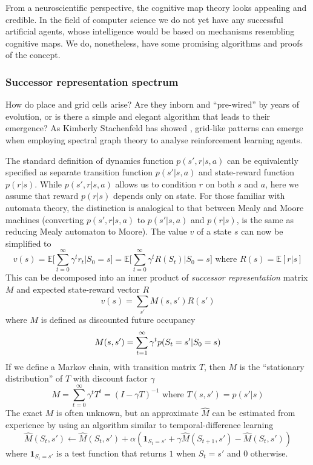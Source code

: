 \documentclass[12pt]{article}
\begin{document}
From a neuroscientific perspective, the cognitive map theory looks appealing and credible. In the field of computer science we do not yet have any successful artificial agents, whose intelligence would be based on mechanisms resembling cognitive maps. We do, nonetheless, have some promising algorithms and proofs of the concept. 


\subsubsection{Successor representation spectrum}
How do place and grid cells arise? Are they inborn and ``pre-wired'' by years of evolution, or is there a simple and elegant algorithm that leads to their emergence? 
As Kimberly Stachenfeld has showed \cite{hipp_as_cog_map}, grid-like patterns can emerge when employing spectral graph theory to analyse reinforcement learning agents. 

The standard definition of dynamics function $p(s',r|s,a)$ can be equivalently specified as separate transition function $p(s'|s,a)$ and state-reward function $p(r|s)$.
While $p(s',r|s,a)$ allows us to condition $r$ on both $s$ and $a$,  here we assume that reward $p(r|s)$ depends only on state. For those familiar with automata theory, the distinction is analogical to that between Mealy and Moore machines (converting $p(s',r|s,a)$ to $p(s'|s,a)$ and $p(r|s)$, is the same as reducing Mealy automaton to Moore). The value $v$ of a state $s$ can now be simplified to
\[
v(s) = \mathbb{E}\big[\sum_{t=0}^\infty \gamma^t r_t\big\vert S_0=s\big] = \mathbb{E}\big[\sum_{t=0}^\infty \gamma^t R(S_t)\big\vert S_0=s\big]\text{ where }R(s)=\mathbb{E}[r|s]
\]
This can be decomposed into an inner product of \textit{successor representation} matrix $M$ and expected state-reward vector $R$
\[
v(s) = \sum_{s'} M(s,s') R(s')
\]
where $M$ is defined as discounted future occupancy
\[
M(s,s') = \sum_{t=1}^\infty \gamma ^t p(S_t=s'|S_0=s) \\
\]
If we define a Markov chain, with transition matrix $T$, then $M$ is the ``stationary distribution'' of $T$ with discount factor $\gamma$
\[
M = \sum_{t=0}^\infty \gamma^t T^t = (I - \gamma T)^{-1}\text{ where }T(s,s')=p(s'|s)
\]
The exact $M$ is often unknown, but an approximate $\hat{M}$ can be estimated from experience by using an algorithm similar to temporal-difference learning
\[
\hat{M}(S_t,s' )  \leftarrow \hat{M}(S_t,s' ) + \alpha (\boldsymbol{1}_{S_t=s'}+\gamma \hat{M}(S_{t+1},s')-\hat{M}(S_t,s'))
\]
where $\boldsymbol{1}_{S_t=s'}$ is a test function that returns $1$ when $S_t=s'$ and $0$ otherwise.
\end{document}
